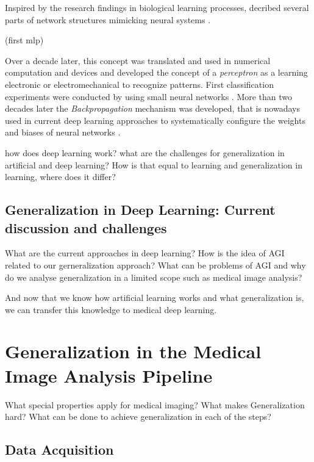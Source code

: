         Inspired by the research findings in biological learning processes, \citeauthor{mcculloch1943logical} decribed several parts of network structures mimicking neural systems \citep{mcculloch1943logical}.

        (first mlp)\citep{rosenblatt1957perceptron}

        Over a decade later, this concept was translated and used in numerical computation and devices and \citeauthor{rosenblatt1957perceptron} developed the concept of a \emph{perceptron} as a learning electronic or electromechanical to recognize patterns.
        First classification experiments were conducted by \citeauthor{widrow1960adaptive} using small neural networks \citep{widrow1960adaptive}.
        More than two decades later the \emph{Backpropagation} mechanism was developed, that is nowadays used in current deep learning approaches to systematically configure the weights and biases of neural networks \citep{rumelhart1986learning}.

        how does deep learning work?
        what are the challenges for generalization in artificial and deep learning?
        How is that equal to learning and generalization in learning, where does it differ?

    \subsection{Generalization in Deep Learning: Current discussion and challenges}
        What are the current approaches in deep learning? How is the idea of AGI related to our gerneralization approach? What can be problems of AGI and why do we analyse generalization in a limited scope such as medical image analysis?



    And now that we know how artificial learning works and what generalization is, we can transfer this knowledge to medical deep learning.

\section{Generalization in the Medical Image Analysis Pipeline}
    What special properties apply for medical imaging?
    What makes Generalization hard?
    What can be done to achieve generalization in each of the steps?

    \subsection{Data Acquisition}
